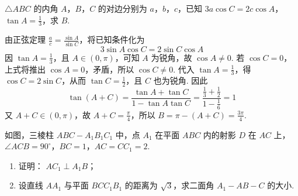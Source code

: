 \begin{problem}
\(\triangle ABC\) 的内角 \(A\)，\(B\)，\(C\) 的对边分别为 \(a\)，\(b\)，\(c\)，已知 \(3a\cos C = 2c\cos A\)，\(\tan A = \frac{1}{3}\)，求 \(B\).
\end{problem}

\begin{solution}
由正弦定理 \(\frac{a}{c}=\frac{\sin A}{\sin C}\)，将已知条件化为
\[
3\sin A\cos C=2\sin C\cos A
\]
因 \(\tan A=\frac13\)，且 \(A\in(0,\pi)\)，可知 \(A\) 为锐角，故 \(\cos A\ne0\). 若 \(\cos C=0\)，上式将推出 \(\cos A=0\)，矛盾，所以 \(\cos C\ne0\). 代入 \(\tan A=\frac13\)，得
\(\cos C=2\sin C\)，从而 \(\tan C=\frac12\)，且 \(C\) 也为锐角.
因此
\[
\tan(A+C)=\frac{\tan A+\tan C}{1-\tan A\tan C}
=\frac{\frac13+\frac12}{1-\frac16}=1
\]
又 \(A+C\in(0,\pi)\)，故 \(A+C=\frac{\pi}{4}\)，所以
\(B=\pi-(A+C)=\frac{3\pi}{4}\).
\end{solution}

\begin{problem}
如图，三棱柱 \(ABC - A_{1}B_{1}C_{1}\) 中，点 \(A_{1}\) 在平面 \(ABC\) 内的射影 \(D\) 在 \(AC\) 上，\(\angle ACB = 90^{\circ}\)，\(BC = 1\)，\(AC = CC_{1} = 2\).

\begin{enumerate}
\item 证明： \(AC_{1} \perp A_{1}B\)；
\item 设直线 \(AA_{1}\) 与平面 \(BCC_{1}B_{1}\) 的距离为 \( \sqrt{3} \)，求二面角 \( A_{1}-AB-C \) 的大小.
\end{enumerate}

\end{problem}

